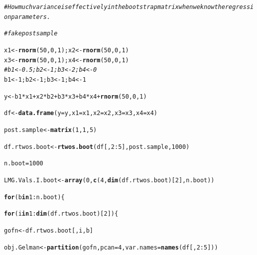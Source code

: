 \documentclass[11pt,a4paper,twoside]{book}
\makeatletter
\newcommand{\hlnum}[1]{\textcolor[rgb]{0.686,0.059,0.569}{#1}}%
\newcommand{\hlcom}[1]{\textcolor[rgb]{0.678,0.584,0.686}{\textit{#1}}}%
\newcommand{\hlopt}[1]{\textcolor[rgb]{0,0,0}{#1}}%
\newcommand{\hlstd}[1]{\textcolor[rgb]{0.345,0.345,0.345}{#1}}%
\newcommand{\hlkwa}[1]{\textcolor[rgb]{0.161,0.373,0.58}{\textbf{#1}}}%
\newcommand{\hlkwb}[1]{\textcolor[rgb]{0.69,0.353,0.396}{#1}}%
\newcommand{\hlkwc}[1]{\textcolor[rgb]{0.333,0.667,0.333}{#1}}%
\newcommand{\hlkwd}[1]{\textcolor[rgb]{0.737,0.353,0.396}{\textbf{#1}}}%
\newenvironment{kframe}{%
 \def\at@end@of@kframe{}%
 \ifinner\ifhmode%
  \def\at@end@of@kframe{\end{minipage}}%
  \begin{minipage}{\columnwidth}%
 \fi\fi%
 \def\FrameCommand##1{\hskip\@totalleftmargin \hskip-\fboxsep
 \colorbox{shadecolor}{##1}\hskip-\fboxsep
     \hskip-\linewidth \hskip-\@totalleftmargin \hskip\columnwidth}%
 \MakeFramed {\advance\hsize-\width
   \@totalleftmargin\z@ \linewidth\hsize
   \@setminipage}}%
 {\par\unskip\endMakeFramed%
 \at@end@of@kframe}
\newenvironment{knitrout}{}{} %
\makeatother
\begin{document}
\begin{knitrout}
\color{fgcolor}\begin{kframe}
\begin{alltt}
\hlcom{#How much variance is effectively in the bootstrap matrix when we know the regression parameters.}

\hlcom{#fake post sample}

\hlstd{x1} \hlkwb{<-} \hlkwd{rnorm}\hlstd{(}\hlnum{50}\hlstd{,} \hlnum{0}\hlstd{,} \hlnum{1}\hlstd{); x2} \hlkwb{<-} \hlkwd{rnorm}\hlstd{(}\hlnum{50}\hlstd{,} \hlnum{0}\hlstd{,} \hlnum{1}\hlstd{)}
\hlstd{x3} \hlkwb{<-} \hlkwd{rnorm}\hlstd{(}\hlnum{50}\hlstd{,} \hlnum{0}\hlstd{,} \hlnum{1}\hlstd{); x4} \hlkwb{<-} \hlkwd{rnorm}\hlstd{(}\hlnum{50}\hlstd{,} \hlnum{0}\hlstd{,} \hlnum{1}\hlstd{)}
\hlcom{#b1 <- 0.5; b2 <- 1; b3 <- 2; b4 <- 0}
\hlstd{b1} \hlkwb{<-} \hlnum{1}\hlstd{; b2} \hlkwb{<-} \hlnum{1}\hlstd{; b3} \hlkwb{<-} \hlnum{1}\hlstd{; b4} \hlkwb{<-} \hlnum{1}

\hlstd{y} \hlkwb{<-} \hlstd{b1}\hlopt{*}\hlstd{x1} \hlopt{+} \hlstd{x2}\hlopt{*}\hlstd{b2} \hlopt{+} \hlstd{b3}\hlopt{*}\hlstd{x3} \hlopt{+} \hlstd{b4}\hlopt{*}\hlstd{x4} \hlopt{+} \hlkwd{rnorm}\hlstd{(}\hlnum{50}\hlstd{,} \hlnum{0}\hlstd{,} \hlnum{1}\hlstd{)}

\hlstd{df} \hlkwb{<-} \hlkwd{data.frame}\hlstd{(}\hlkwc{y} \hlstd{= y,} \hlkwc{x1} \hlstd{= x1,} \hlkwc{x2} \hlstd{= x2,} \hlkwc{x3} \hlstd{= x3,} \hlkwc{x4} \hlstd{= x4)}

\hlstd{post.sample} \hlkwb{<-} \hlkwd{matrix}\hlstd{(}\hlnum{1}\hlstd{,} \hlnum{1}\hlstd{,}\hlnum{5}\hlstd{)}

\hlstd{df.rtwos.boot} \hlkwb{<-}\hlkwd{rtwos.boot}\hlstd{(df[,}\hlnum{2}\hlopt{:}\hlnum{5}\hlstd{], post.sample,} \hlnum{1000}\hlstd{)}

\hlstd{n.boot} \hlkwb{=} \hlnum{1000}

\hlstd{LMG.Vals.I.boot}\hlkwb{<-}\hlkwd{array}\hlstd{(}\hlnum{0}\hlstd{,} \hlkwd{c}\hlstd{(}\hlnum{4}\hlstd{,}\hlkwd{dim}\hlstd{(df.rtwos.boot)[}\hlnum{2}\hlstd{], n.boot))}

\hlkwa{for} \hlstd{(b} \hlkwa{in} \hlnum{1}\hlopt{:}\hlstd{n.boot)\{}

\hlkwa{for}\hlstd{(i} \hlkwa{in} \hlnum{1}\hlopt{:}\hlkwd{dim}\hlstd{(df.rtwos.boot)[}\hlnum{2}\hlstd{])\{}

        \hlstd{gofn}\hlkwb{<-}\hlstd{df.rtwos.boot[,i,b]}

        \hlstd{obj.Gelman}\hlkwb{<-}\hlkwd{partition}\hlstd{(gofn,} \hlkwc{pcan} \hlstd{=} \hlnum{4}\hlstd{,} \hlkwc{var.names} \hlstd{=} \hlkwd{names}\hlstd{(df[,}\hlnum{2}\hlopt{:}\hlnum{5}\hlstd{]))}


\end{alltt}
\end{kframe}
\end{knitrout}
\end{document}
